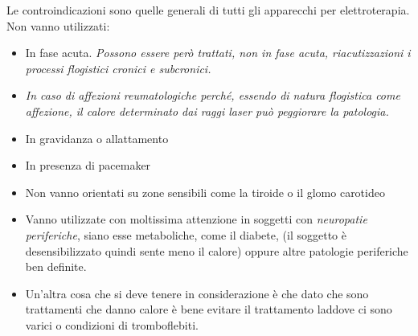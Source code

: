 Le controindicazioni sono quelle generali di tutti gli apparecchi per
elettroterapia. Non vanno utilizzati:

\begin{itemize}
\item
  In fase acuta. \emph{Possono essere però trattati, non in fase acuta,
  riacutizzazioni i processi flogistici cronici e subcronici.}
\item
  \emph{In caso di affezioni reumatologiche perché, essendo di natura
  flogistica come affezione, il calore determinato dai raggi laser può
  peggiorare la patologia.}
\item
  In gravidanza o allattamento
\item
  In presenza di pacemaker
\item
  Non vanno orientati su zone sensibili come la tiroide o il glomo
  carotideo
\item
  Vanno utilizzate con moltissima attenzione in soggetti con
  \emph{neuropatie periferiche}, siano esse metaboliche, come il
  diabete, (il soggetto è desensibilizzato quindi sente meno il calore)
  oppure altre patologie periferiche ben definite.
\item
  Un'altra cosa che si deve tenere in considerazione è che dato che sono
  trattamenti che danno calore è bene evitare il trattamento laddove ci
  sono varici o condizioni di tromboflebiti.
\end{itemize}
